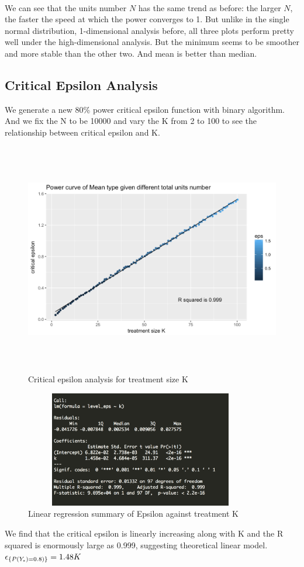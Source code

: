 \documentclass[10pt,english]{article}\usepackage{graphicx, color}
\numberwithin{equation}{section}
\numberwithin{figure}{section}
\begin{document}
\quad\\
We can see that the units number $N$ has the same trend as before: the larger $N$, the faster the speed at which the power converges to 1. But unlike in the single normal distribution, 1-dimensional analysis before, all three plots perform pretty well under the high-dimensional analysis. But the minimum seems to be smoother and more stable than the other two. And mean is better than median.\\
\newpage
\subsection{Critical Epsilon Analysis}
We generate a new 80\% power critical epsilon function with binary algorithm. And we fix the N to be 10000 and vary the K from 2 to 100 to see the relationship between critical epsilon and K.\\

\begin{figure}[htbp]
\centering\includegraphics[width=6in, height=4in]{epsilon}
\caption{Critical epsilon analysis for treatment size K}
\end{figure}

\begin{figure}[htbp]
\centering\includegraphics[width=4in, height=2in]{reg}
\caption{Linear regression summary of Epsilon against treatment K}
\end{figure}

We find that the critical epsilon is linearly increasing along with K and the R squared is enormously large as 0.999, suggesting theoretical linear model. 
$\epsilon_{\{ P(Y_{\epsilon})  \quad\\ = \quad\\  0.8)\}} = 1.48K$
\end{document}
